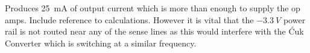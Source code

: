 \\ \\
Produces \SI{25}{mA} of output current which is more than enough to supply the op amps. Include reference to calculations. However it is vital that the $-\SI{3.3}{V}$ power rail is not routed near any of the sense lines as this would interfere with the \'Cuk Converter which is switching at a similar frequency.
